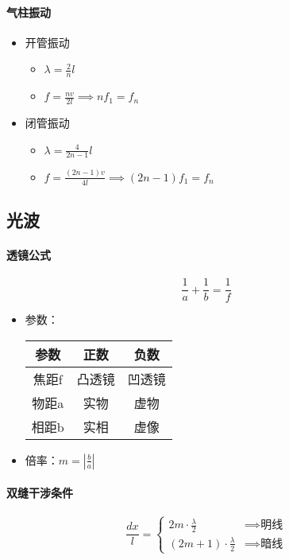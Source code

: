 \paragraph{气柱振动}
\begin{itemize}
    \item 开管振动
    \begin{itemize}
        \item $\lambda=\frac{2}{n}l$
        \item $f=\frac{nv}{2l}\implies nf_1=f_n$
    \end{itemize}
    \item 闭管振动
    \begin{itemize}
        \item $\lambda=\frac{4}{2n-1}l$
        \item $f=\frac{(2n-1)v}{4l}\implies (2n-1)f_1=f_n$
    \end{itemize}
\end{itemize}

\subsection{光波}

\paragraph{透镜公式}
\begin{equation*}
    \frac{1}{a}+\frac{1}{b}=\frac{1}{f}
\end{equation*}
\begin{itemize}
    \item 参数：
    \begin{center}
        \renewcommand\arraystretch{1.2}
        \begin{tabular}{c|cc}
            \hline
            参数&正数&负数\\\hline
            焦距f&凸透镜&凹透镜\\
            物距a&实物&虚物\\
            相距b&实相&虚像\\\hline
        \end{tabular}
    \end{center}
    \item 倍率：$m=\left\lvert\frac{b}{a}\right\rvert$
\end{itemize}

\paragraph{双缝干涉条件}
\begin{equation*}
    \frac{dx}{l}=
    \begin{cases}
        2m\cdot\frac{\lambda}{2}&\implies\textrm{明线}\\
        (2m+1)\cdot\frac{\lambda}{2}&\implies\textrm{暗线}
    \end{cases}
\end{equation*}

